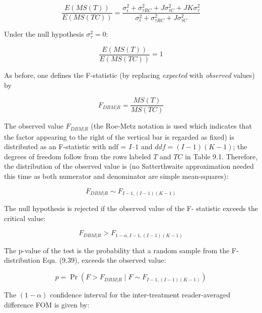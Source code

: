 \documentclass[
]{book}
\begin{document}
\begin{equation}
\frac{E\left ( MS(T) \right )}{E\left ( MS(TC) \right )} = \frac{\sigma_{\epsilon}^{2}+\sigma_{\tau RC}^{2}+J\sigma_{\tau C}^{2}+JK\sigma_{\tau}^{2}}{\sigma_{\epsilon}^{2}+\sigma_{\tau RC}^{2}+J\sigma_{\tau C}^{2}}
\end{equation}

Under the null hypothesis \(\sigma_{\tau}^{2} = 0\):

\begin{equation}
\frac{E\left ( MS(T) \right )}{E\left ( MS(TC) \right )} = 1
\end{equation}

As before, one defines the F-statistic (by replacing \emph{expected} with \emph{observed} values) by

\begin{equation}
F_{DBM|R}=\frac{MS(T)}{MS(TC)}
\label{eq:FStatFRRC}
\end{equation}

The observed value \(F_{DBM|R}\) (the Roe-Metz notation \citep{RN1124} is used which indicates that the factor appearing to the right of the vertical bar is regarded as fixed) is distributed as an F-statistic with \(\text{ndf}\) = \(I – 1\) and \(ddf = (I-1)(K-1)\); the degrees of freedom follow from the rows labeled \(T\) and \(TC\) in Table 9.1. Therefore, the distribution of the observed value is (no Satterthwaite approximation needed this time as both numerator and denominator are simple mean-squares):

\begin{equation}
F_{DBM|R} \sim F_{I-1,(I-1)(K-1)}
\label{eq:SamplingFStatFRRC}
\end{equation}

The null hypothesis is rejected if the observed value of the F- statistic exceeds the critical value:

\begin{equation}
F_{DBM|R} > F_{1-\alpha,I-1,(I-1)(K-1)}
\label{eq:NhRejectRuleFRRC}
\end{equation}

The p-value of the test is the probability that a random sample from the F-distribution Eqn. (9.39), exceeds the observed value:

\begin{equation}
p=\Pr\left ( F> F_{DBM|R} \mid F \sim F_{I-1,(I-1)(K-1)} \right )
\label{eq:pFRRC}
\end{equation}

The \((1-\alpha)\) confidence interval for the inter-treatment reader-averaged difference FOM is given by:
\end{document}
